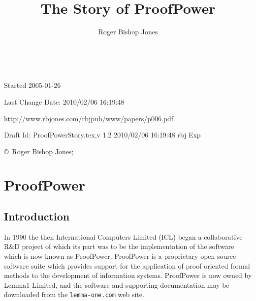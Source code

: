 \documentclass[10pt,titlepage]{book}
\title{The Story of ProofPower}
\author{Roger Bishop Jones}
\date{\ }
\def\Product{ProofPower}
\begin{document}
\frontmatter

\begin{titlepage}
\maketitle

\vfill



\vfill

\begin{centering}

\vfill

\footnotesize{
Started 2005-01-26

Last Change $ $Date: 2010/02/06 16:19:48 $ $

\href{http://www.rbjones.com/rbjpub/www/papers/p006.pdf}{http://www.rbjones.com/rbjpub/www/papers/p006.pdf}

Draft $ $Id: ProofPowerStory.tex,v 1.2 2010/02/06 16:19:48 rbj Exp $ $

\copyright\ Roger Bishop Jones;

}%
\end{centering}

\end{titlepage}

{\parskip=0pt\tableofcontents}

\mainmatter

\chapter{ProofPower}


\section{Introduction}

In 1990 the then International Computers Limited (ICL) began a collaborative R\&D project of which its part was to be the implementation of the software which is now known as {\Product}.
{\Product} is a proprietary open source software suite which provides support for the application of proof oriented formal methods to the development of information systems.
{\Product} is now owned by Lemma1 Limited, and the software and supporting documentation may be downloaded from the {\tt lemma-one.com} web site.
\end{document}
